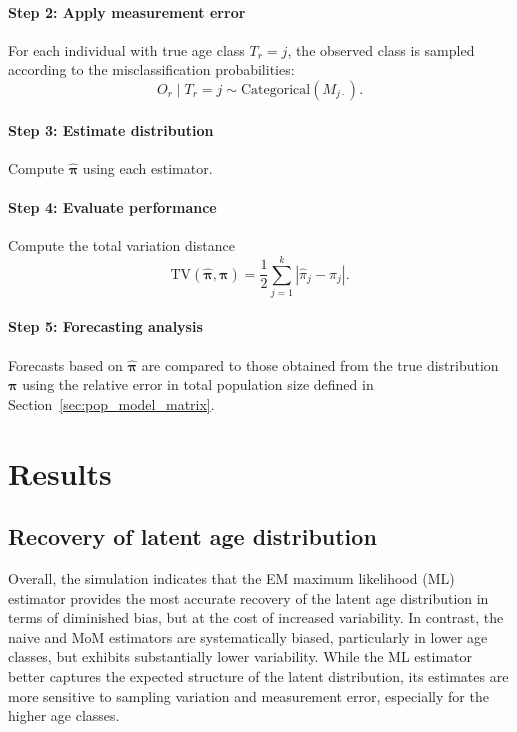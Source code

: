 \documentclass[11pt,a4paper]{article}
\begin{document}
\paragraph{Step 2: Apply measurement error}
For each individual with true age class $T_r = j$, the observed class is sampled according to the misclassification probabilities:
\[
O_r \mid T_r = j \sim \text{Categorical}(M_{j\cdot}).
\]

\paragraph{Step 3: Estimate distribution}
Compute $\hat{\boldsymbol{\pi}}$ using each estimator.

\paragraph{Step 4: Evaluate performance}
Compute the total variation distance
\[
\mathrm{TV}(\hat{\boldsymbol{\pi}}, \boldsymbol{\pi})
= \frac{1}{2} \sum_{j=1}^{k} |\hat{\pi}_j - \pi_j|.
\]

\paragraph{Step 5: Forecasting analysis}
Forecasts based on $\hat{\boldsymbol{\pi}}$ are compared to those obtained from the true distribution $\boldsymbol{\pi}$ using the relative error in total population size defined in Section~\ref{sec:pop_model_matrix}.


\section{Results}
\subsection{Recovery of latent age distribution}


Overall, the simulation indicates that the EM maximum likelihood (ML) estimator provides the most accurate recovery of the latent age distribution in terms of diminished bias, but at the cost of increased variability. In contrast, the naive and MoM estimators are systematically biased, particularly in lower age classes, but exhibits substantially lower variability. While the ML estimator better captures the expected structure of the latent distribution, its estimates are more sensitive to sampling variation and measurement error, especially for the higher age classes.
\end{document}
